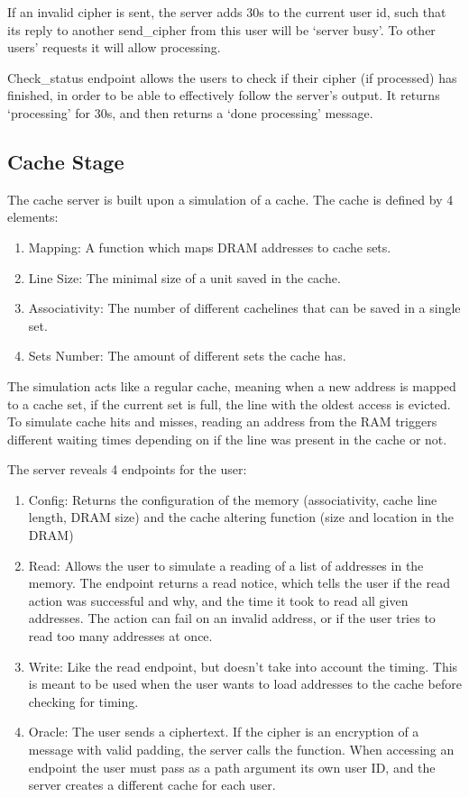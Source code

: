 \documentclass[sigconf]{acmart}
\begin{document}
If an invalid cipher is sent, the server adds 30s to the current user id, such that its reply to another send\_cipher from this user will be ‘server busy’. To other users’ requests it will allow processing.

Check\_status endpoint allows the users to check if their cipher (if processed) has finished, in order to be able to effectively follow the server’s output. It returns ‘processing’ for 30s, and then returns a ‘done processing’ message. 

\subsection{Cache Stage}
The cache server is built upon a simulation of a cache. The cache is defined by 4 elements:

\begin{enumerate}
    \item Mapping: A function which maps DRAM addresses to cache sets.
    \item Line Size: The minimal size of a unit saved in the cache.
    \item Associativity: The number of different cachelines that can be saved in a single set.
    \item Sets Number: The amount of different sets the cache has.
\end{enumerate}

The simulation acts like a regular cache, meaning when a new address is mapped to a cache set, if the current set is full, the line with the oldest access is evicted. To simulate cache hits and misses, reading an address from the RAM triggers different waiting times depending on if the line was present in the cache or not.

The server reveals 4 endpoints for the user:

\begin{enumerate}
    \item Config: Returns the configuration of the memory (associativity, cache line length, DRAM size) and the cache altering function (size and location in the DRAM)
    \item Read: Allows the user to simulate a reading of a list of addresses in the memory. The endpoint returns a read notice, which tells the user if the read action was successful and why, and the time it took to read all given addresses. The action can fail on an invalid address, or if the user tries to read too many addresses at once.
    \item Write: Like the read endpoint, but doesn’t take into account the timing. This is meant to be used when the user wants to load addresses to the cache before checking for timing.
    \item Oracle: The user sends a ciphertext. If the cipher is an encryption of a message with valid padding, the server calls the function.
When accessing an endpoint the user must pass as a path argument its own user ID, and the server creates a different cache for each user.
\end{enumerate}
\end{document}
